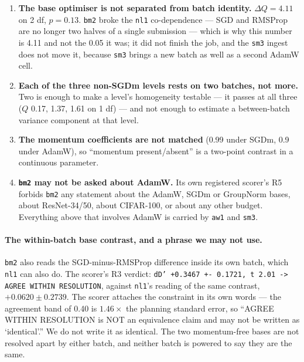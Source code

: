 \documentclass[10pt,letterpaper]{article}
\newcommand{\arm}[1]{\texttt{#1}}
\begin{document}
\begin{enumerate}
\item \textbf{The base optimiser is not separated from batch identity.} $\Delta Q = 4.11$ on
  2 df, $p = 0.13$. \arm{bm2} broke the \arm{nl1} co-dependence --- SGD and RMSProp are no longer
  two halves of a single submission --- which is why this number is 4.11 and not the 0.05 it was;
  it did not finish the job, and the \arm{sm3} ingest does not move it, because \arm{sm3} brings
  a new batch as well as a second AdamW cell.
\item \textbf{Each of the three non-SGDm levels rests on two batches, not more.} Two is enough to
  make a level's homogeneity testable --- it passes at all three ($Q$ 0.17, 1.37, 1.61 on 1 df)
  --- and not enough to estimate a between-batch variance component at that level.
\item \textbf{The momentum coefficients are not matched} (0.99 under SGDm, 0.9 under AdamW), so
  ``momentum present/absent'' is a two-point contrast in a continuous parameter.
\item \textbf{\arm{bm2} may not be asked about AdamW.} Its own registered scorer's R5 forbids
  \arm{bm2} any statement about the AdamW, SGDm or GroupNorm bases, about ResNet-34/50, about
  CIFAR-100, or about any other budget. Everything above that involves AdamW is carried by
  \arm{aw1} and \arm{sm3}.
\end{enumerate}

\paragraph{The within-batch base contrast, and a phrase we may not use.}
\arm{bm2} also reads the SGD-minus-RMSProp difference inside its own batch, which \arm{nl1} can
also do. The scorer's R3 verdict: \texttt{dD' +0.3467 +- 0.1721, t 2.01 -> AGREE WITHIN
RESOLUTION}, against \arm{nl1}'s reading of the same contrast, $+0.0620 \pm 0.2739$. The scorer
attaches the constraint in its own words --- the agreement band of 0.40 is $1.46\times$ the
planning standard error, so ``AGREE WITHIN RESOLUTION is NOT an equivalence claim and may not be
written as `identical'.'' We do not write it as identical. The two momentum-free bases are not
resolved apart by either batch, and neither batch is powered to say they are the same.
\end{document}
